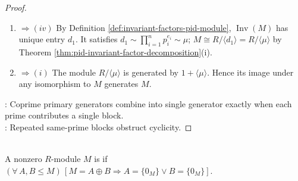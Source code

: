 \begin{theorem}
\begin{proof}
\begin{enumerate}[label=(\roman*)]
By Proposition \ref{prop:elementary-divisors-direct-sums}, iterated over the primary components, $\operatorname{ElemDiv}(M)=\{p_i^{e_i}:i\in I\}$.\\
\item[$(iii)$]$\Rightarrow (iv)$ By Definition \ref{def:invariant-factors-pid-module}, $\operatorname{Inv}(M)$ has unique entry $d_1$. It satisfies $d_1\sim\prod\limits_{i=1}^np_i^{e_i}\sim\mu$; $M\cong R/\langle d_1\rangle=R/\langle\mu\rangle$ by Theorem \ref{thm:pid-invariant-factor-decomposition}(i).\\
\item[$(iv)$]$\Rightarrow (i)$ The module $R/\langle\mu\rangle$ is generated by $1+\langle\mu\rangle$. Hence its image under any isomorphism to $M$ generates $M$.
\end{enumerate}
: Coprime primary generators combine into single generator exactly when each prime contributes a single block.\\
: Repeated same-prime blocks obstruct cyclicity.
\end{proof}
\end{theorem}

\begin{definition} \label{def:indecomposable-module} \\
A nonzero $R$-module $M$ is  if $(\forall\,A,B\leq M)\,[M=A\oplus B\Rightarrow A=\{0_M\}\lor B=\{0_M\}]$.
\end{definition}

